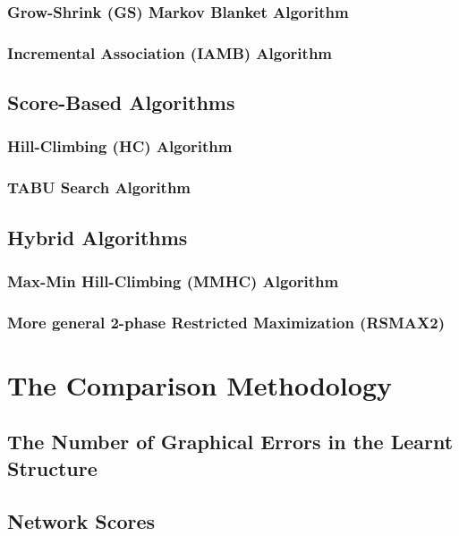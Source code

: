 \documentclass[12pt,a4paper,oneside]{book}
\theoremstyle{plain}
\theoremstyle{definition}
\theoremstyle{remark}
\theoremstyle{definition}
\numberwithin{equation}{chapter}
\begin{document}
\subsection{Grow-Shrink (GS) Markov Blanket Algorithm}


\subsection{Incremental Association (IAMB) Algorithm}
	

%
\section{Score-Based Algorithms}	
\subsection{Hill-Climbing (HC) Algorithm}


\subsection{TABU Search Algorithm}


%
\section{Hybrid Algorithms}
\subsection{Max-Min Hill-Climbing (MMHC) Algorithm}


\subsection{More general 2-phase Restricted Maximization (RSMAX2)}






\chapter{The Comparison Methodology}
\section{The Number of Graphical Errors in the Learnt Structure}


\section{Network Scores}

\end{document}
